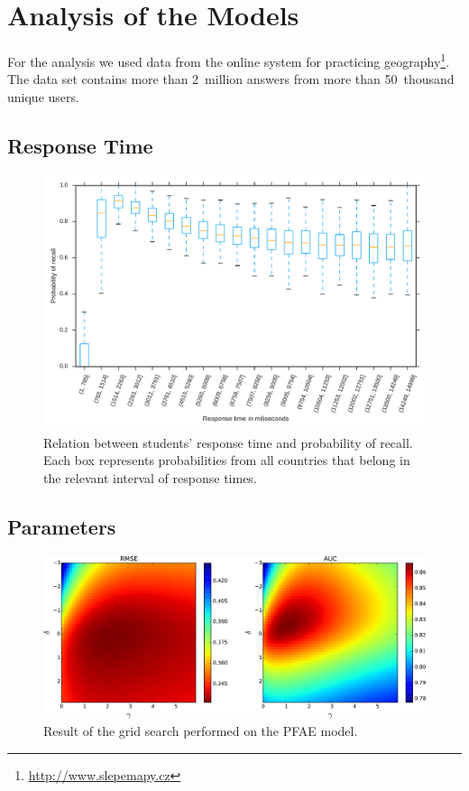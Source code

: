 \chapter{Analysis of the Models}

For the analysis we used data from the online system for practicing geography\footnote{\url{http://www.slepemapy.cz}}. The data set contains more than 2~million answers from more than 50~thousand unique users.

\section{Response Time}

\begin{figure}[htbp]
  \centering
  \includegraphics[width=\textwidth]{img/response-time}
  \caption{Relation between students' response time and probability of recall. Each box represents probabilities from all countries that belong in the relevant interval of response times.}
  \label{fig-response-time}
\end{figure}

\section{Parameters}

\begin{figure}[htbp]
  \centering
  \includegraphics[width=\textwidth]{img/pfa-grid-search-rmse-auc}
  \caption{Result of the grid search performed on the PFAE model.}
  \label{fig-grid-search-rmse-auc}
\end{figure}

